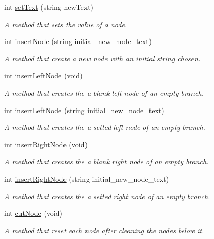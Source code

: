 \begin{DoxyCompactItemize}
\item 
int \hyperlink{classStringNode_aa87f867d5e9ba8f8263afe8b32cd1df8}{set\+Text} (string new\+Text)
\begin{DoxyCompactList}\small\item\em A method that sets the value of a node. \end{DoxyCompactList}\item 
int \hyperlink{classStringNode_a0496eef4a3ff3c8134ba1ce2e1f01804}{insert\+Node} (string initial\+\_\+new\+\_\+node\+\_\+text)
\begin{DoxyCompactList}\small\item\em A method that create a new node with an initial string chosen. \end{DoxyCompactList}\item 
int \hyperlink{classStringNode_a9deca96372ae91bea728cc9ff5236441}{insert\+Left\+Node} (void)
\begin{DoxyCompactList}\small\item\em A method that creates the a blank left node of an empty branch. \end{DoxyCompactList}\item 
int \hyperlink{classStringNode_a4199a842393aa4d98c3695858b097128}{insert\+Left\+Node} (string initial\+\_\+new\+\_\+node\+\_\+text)
\begin{DoxyCompactList}\small\item\em A method that creates the a setted left node of an empty branch. \end{DoxyCompactList}\item 
int \hyperlink{classStringNode_acdd9f10faab37dd69762ab3774d50775}{insert\+Right\+Node} (void)
\begin{DoxyCompactList}\small\item\em A method that creates the a blank right node of an empty branch. \end{DoxyCompactList}\item 
int \hyperlink{classStringNode_abf313da2479d5c40c2769474948a7398}{insert\+Right\+Node} (string initial\+\_\+new\+\_\+node\+\_\+text)
\begin{DoxyCompactList}\small\item\em A method that creates the a setted right node of an empty branch. \end{DoxyCompactList}\item 
int \hyperlink{classStringNode_acd57ad0e36258a8fada5b092083218f0}{cut\+Node} (void)
\begin{DoxyCompactList}\small\item\em A method that reset each node after cleaning the nodes below it. \end{DoxyCompactList}\item 

\end{DoxyCompactItemize}
